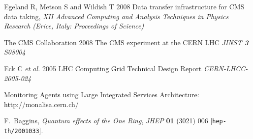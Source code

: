 

\begin{thebibliography}{1}

  Egeland R, Metson S and Wildish T 2008 Data transfer infrastructure for CMS data taking,  {\it XII Advanced Computing and Analysis Techniques in Physics Research (Erice, Italy: Proceedings of Science)}

The CMS Collaboration 2008 The CMS experiment at the CERN LHC {\it JINST {\bf 3} S08004}

Eck C {\it et al.} 2005 LHC Computing Grid Technical Design Report {\it CERN-LHCC-2005-024}

Monitoring Agents using Large Integrated Services Architecture: http://monalisa.cern.ch/

F.~Baggins, \emph{Quantum effects of the One Ring},
\emph{JHEP} {\bf 01} (3021) 006 [{\tt hep-th/2001033}].

\end{thebibliography}
